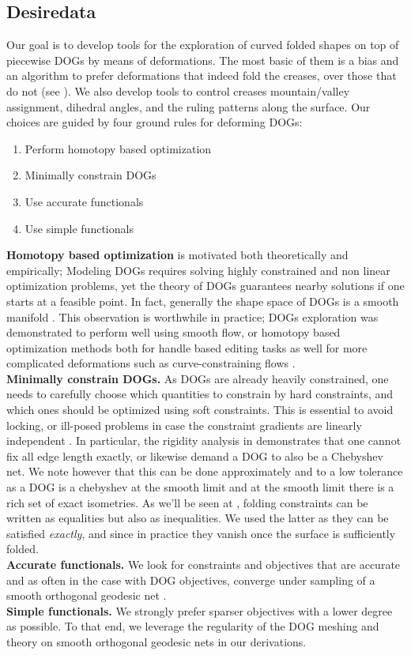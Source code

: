 \subsection{Desiredata}
Our goal is to develop tools for the exploration of curved folded shapes on top of piecewise DOGs by means of deformations. The most basic of them is a bias and an algorithm to prefer deformations that indeed fold the creases, over those that do not (see ). We also develop tools to control creases mountain/valley assignment, dihedral angles, and the ruling patterns along the surface. Our choices are guided by four ground rules for deforming DOGs:
\begin{enumerate}
  \item Perform homotopy based optimization \label{homotopy_opt}
  \item Minimally constrain DOGs \label{minimal_const}
  \item Use accurate functionals \label{accurate_func}
  \item Use simple functionals
\end{enumerate}
\textbf{Homotopy based optimization} is motivated both theoretically and empirically; Modeling DOGs requires solving highly constrained and non linear optimization problems, yet the theory of DOGs guarantees nearby solutions if one starts at a feasible point. In fact, generally the shape space of DOGs is a smooth manifold \cite{rabi2018shape}. This observation is worthwhile in practice; DOGs exploration was demonstrated to perform well using smooth flow, or homotopy based optimization methods both for handle based editing tasks as well for more complicated deformations such as curve-constraining flows \cite{rabi2018shape}. \\
\textbf{Minimally constrain DOGs.} As DOGs are already heavily constrained, one needs to carefully choose which quantities to constrain by hard constraints, and which ones should be optimized using soft constraints. This is essential to avoid locking, or ill-posed problems in case the constraint gradients are linearly independent \cite{rabi2018shape}. In particular, the rigidity analysis in \cite{rabi18} demonstrates that one cannot fix all edge length exactly, or likewise demand a DOG to also be a Chebyshev net. We note however that this can be done approximately and to a low tolerance as a DOG is a chebyshev at the smooth limit and at the smooth limit there is a rich set of exact isometries. As we'll be seen at , folding constraints can be written as equalities but also as inequalities. We used the latter as they can be satisfied \textit{exactly}, and since in practice they vanish once the surface is sufficiently folded. \\
\textbf{Accurate functionals.} We look for constraints and objectives that are accurate and as often in the case with DOG objectives, converge under sampling of a smooth orthogonal geodesic net \cite{rabi18,rabi2018shape}. \\
\textbf{Simple functionals.} We strongly prefer sparser objectives with a lower degree as possible. To that end, we leverage the regularity of the DOG meshing and theory on smooth orthogonal geodesic nets in our derivations. \\

